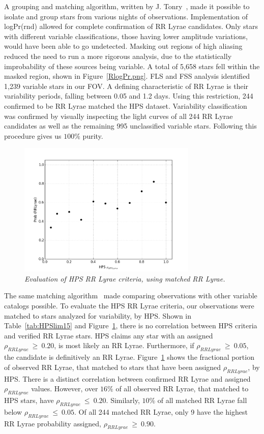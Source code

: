 \documentclass[aps,prb,twocolumn,superscriptaddress]{revtex4-1}
\begin{document}
A grouping and matching algorithm, written by J. Tonry~\cite{gri}, made it possible to isolate and group 
stars from various nights of observations.  
Implementation of logPr(rnd) allowed for complete confirmation of RR Lyrae candidates.  Only stars with different 
variable classifications, those having lower amplitude variations, would have been able to go
undetected.  Masking out regions of high aliasing reduced the need to run a more rigorous analysis, %
due to the statistically improbability of these sources being variable.  A total of 5,658 stars fell within 
the masked region, shown in Figure~\ref{RlogPr.png}.  FLS and FSS analysis identified 1,239 variable stars in our FOV.  
A defining characteristic of RR Lyrae is their variability periods, falling between 0.05 and 1.2 days.  Using this 
restriction, 244 confirmed to be RR Lyrae matched the HPS dataset.  Variability classification was confirmed by visually inspecting 
the light curves of all 244 RR Lyrae candidates as well as the remaining 995 unclassified variable stars.  Following this procedure gives us 
$100\%$ purity.

\begin{figure}[H]
 \centering
 	\includegraphics[width=3.35in]{figures/NEW/probrr_vs_HPS.png}
 \caption{\it \small{Evaluation of HPS RR Lyrae criteria, using matched RR Lyrae.}}
 \label{fig:probrrHPS}
\end{figure}

The same matching algorithm~\cite{gri} made comparing observations with other variable catalogs possible.  
To evaluate the HPS RR Lyrae criteria, our observations were matched to stars analyzed for variability, by HPS.  
Shown in Table~\ref{tab:HPSlim15} and Figure~\ref{fig:probrrHPS}, there is no correlation between HPS criteria and 
verified RR Lyrae stars.  HPS claims any star with an assigned $\rho_{RRLyrae}~\geq~0.20$, is most likely an RR Lyrae.  Furthermore, 
if $\rho_{RRLyrae}~\geq~0.05$, the candidate is definitively an RR Lyrae.  Figure~\ref{fig:probrrHPS} shows the fractional 
portion of observed RR Lyrae, that matched to stars that have been assigned $\rho_{RRLyrae}$, by HPS.
There is a distinct correlation between confirmed RR Lyrae and assigned $\rho_{RRLyrae}$ values.  However, over $16\%$ of 
all observed RR Lyrae, that matched to HPS stars, have $\rho_{RRLyrae}~\leq~0.20$.  Similarly, $10\%$ of all matched RR Lyrae 
fall below $\rho_{RRLyrae}~\leq~0.05$.  Of all 244 matched RR Lyrae, only 9 have the highest RR Lyrae 
probability assigned, $\rho_{RRLyrae}~\geq~0.90$.
\end{document}
